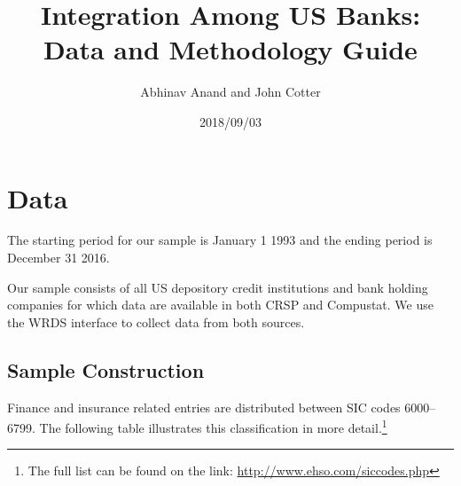 \documentclass[11pt,]{article}
\title{Integration Among US Banks: Data and Methodology Guide}
\author{Abhinav Anand and John Cotter}
\date{2018/09/03}
\let\rmarkdownfootnote\footnote%
\def\footnote{\protect\rmarkdownfootnote}
\begin{document}
\maketitle

\section{Data}\label{data}

The starting period for our sample is January 1 1993 and the ending
period is December 31 2016.

Our sample consists of all US depository credit institutions and bank
holding companies for which data are available in both CRSP and
Compustat. We use the WRDS interface to collect data from both sources.

\subsection{Sample Construction}\label{sample-construction}

Finance and insurance related entries are distributed between SIC codes
6000--6799. The following table illustrates this classification in more
detail.\footnote{The full list can be found on the link:
  \url{http://www.ehso.com/siccodes.php}}
\end{document}
